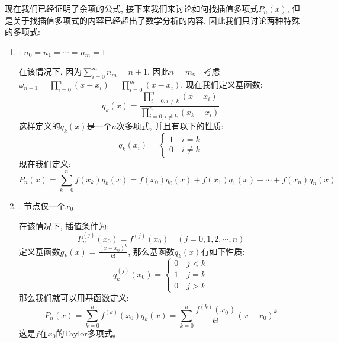 现在我们已经证明了余项的公式, 接下来我们来讨论如何找插值多项式$P_n(x)$, 但是关于找插值多项式的内容已经超出了数学分析的内容, 因此我们只讨论两种特殊的多项式:
\begin{enumerate}
    \item {}: $n_0 = n_1 = \cdots = n_m = 1$
    
    在该情况下, 因为$\sum_{i=0}^{m}n_m = n+1$, 因此$n = m$。
    考虑$\omega_{n+1} = \prod_{i=0}^{n}(x-x_i) = \prod_{i=0}^{m}(x-x_i)$, 现在我们定义基函数:
    \begin{equation*}
        q_k(x) = \frac{\prod_{i=0, i\neq k}^{n}(x-x_i)}{\prod_{i=0, i\neq k}^{n}(x_k-x_i)}
    \end{equation*}
    这样定义的$q_k(x)$是一个$n$次多项式, 并且有以下的性质:
    \begin{equation*}
        q_k(x_i) = \left\{
            \begin{aligned}
                1 \quad i = k\\
                0 \quad i \neq k
            \end{aligned}
         \right.
    \end{equation*}
    现在我们定义:
    \begin{equation*}
        P_n(x) = \sum_{k=0}^{n}f(x_k)q_k(x) = f(x_0)q_0(x)+f(x_1)q_1(x) + \cdots + f(x_n)q_n(x)
    \end{equation*}
    \item {}: 节点仅一个$x_0$
    
    在该情况下, 插值条件为:
    \begin{equation*}
        P_n^{(j)}(x_0) = f^{(j)}(x_0) \quad (j = 0, 1, 2, \cdots , n)
    \end{equation*}
    定义基函数$g_k(x) = \frac{(x-x_0)^k}{k!}$, 那么基函数$q_k(x)$有如下性质:
    \begin{equation*}
        q_k^{(j)}(x_0) = \left\{
            \begin{aligned}
                0 \quad j < k \\
                1 \quad j = k \\
                0 \quad j > k
            \end{aligned}
        \right.
    \end{equation*}
    那么我们就可以用基函数定义:
    \begin{equation*}
        P_n(x) = \sum_{k=0}^{n}f^{(k)}(x_0)q_k(x) = \sum_{k=0}^{n}\frac{f^{(k)}(x_0)}{k!}(x-x_0)^k
    \end{equation*}
    这是$f$在$x_0$的Taylor多项式。
\end{enumerate}

